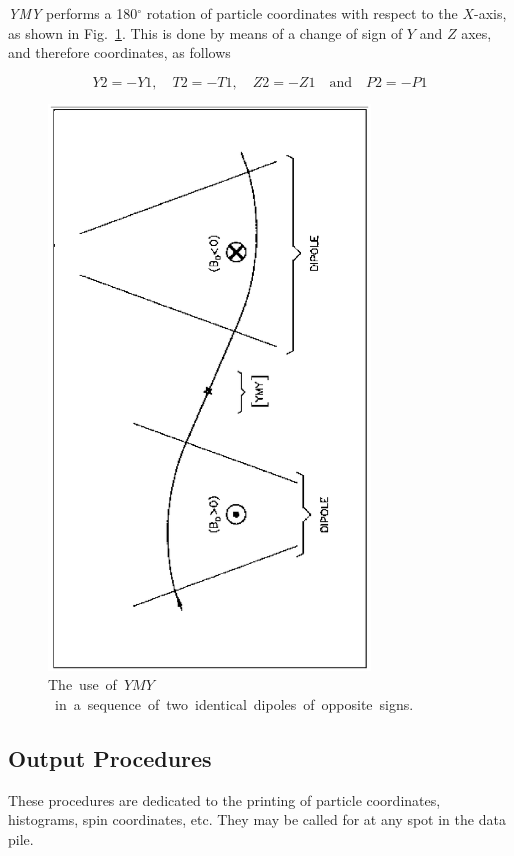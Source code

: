 \textsl{YMY}  performs a 180$^\circ$ rotation of particle coordinates with respect to the 
$ X $-axis, as shown  in Fig.~\ref{fig33}. 
This is done by means of a change of sign of $ Y $ and $ Z $ axes,  
and therefore coordinates, as follows 

$$ Y2=-Y1,\quad T2=-T1,\quad Z2=-Z1 \quad \text{and} \quad P2=-P1 $$

\vfill
\begin{figure}[H]
\centerline{\includegraphics[height=15cm,angle=-90]{Fig33.ps}}
\caption{\label{fig33}\mbox{The use of $ YMY $ in a sequence of two identical
dipoles of opposite signs.}}
\end{figure}
\vfill

\newpage  %

\subsection{Output Procedures} \label{sec4.5}

 These procedures are dedicated to the printing of particle coordinates, 
histograms, spin coordinates, etc. They may be called for at any spot in the data pile. 



